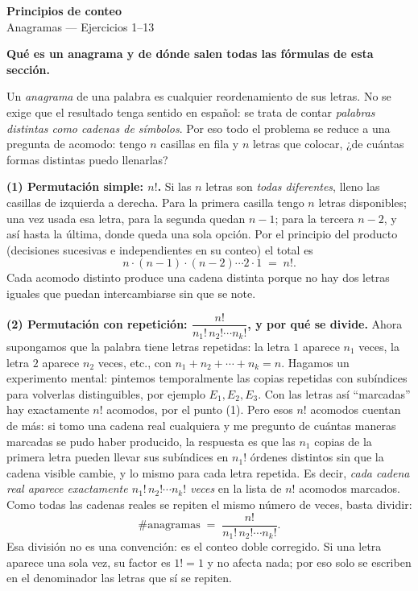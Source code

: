 \documentclass[11pt]{article}
\begin{document}
\begin{center}{\LARGE\bfseries Principios de conteo}\\[2pt]{\large Anagramas --- Ejercicios 1--13}\end{center}

\vspace{4pt}

\begin{teo}
\textbf{Qué es un anagrama y de dónde salen todas las fórmulas de esta sección.}

Un \emph{anagrama} de una palabra es cualquier reordenamiento de sus letras. No se exige que el resultado
tenga sentido en español: se trata de contar \emph{palabras distintas como cadenas de símbolos}. Por eso
todo el problema se reduce a una pregunta de acomodo: tengo $n$ casillas en fila y $n$ letras que colocar,
¿de cuántas formas distintas puedo llenarlas?

\medskip
\textbf{(1) Permutación simple: $n!$.} Si las $n$ letras son \emph{todas diferentes}, lleno las casillas de
izquierda a derecha. Para la primera casilla tengo $n$ letras disponibles; una vez usada esa letra, para la
segunda quedan $n-1$; para la tercera $n-2$, y así hasta la última, donde queda una sola opción. Por el
principio del producto (decisiones sucesivas e independientes en su conteo) el total es
\[
n\cdot(n-1)\cdot(n-2)\cdots 2\cdot 1 \;=\; n!.
\]
Cada acomodo distinto produce una cadena distinta porque no hay dos letras iguales que puedan intercambiarse
sin que se note.

\medskip
\textbf{(2) Permutación con repetición: $\dfrac{n!}{n_1!\,n_2!\cdots n_k!}$, y por qué se divide.} Ahora
supongamos que la palabra tiene letras repetidas: la letra $1$ aparece $n_1$ veces, la letra $2$ aparece
$n_2$ veces, etc., con $n_1+n_2+\cdots+n_k=n$. Hagamos un experimento mental: pintemos temporalmente las
copias repetidas con subíndices para volverlas distinguibles, por ejemplo $E_1,E_2,E_3$. Con las letras así
``marcadas'' hay exactamente $n!$ acomodos, por el punto (1). Pero esos $n!$ acomodos cuentan de más: si
tomo una cadena real cualquiera y me pregunto de cuántas maneras marcadas se pudo haber producido, la
respuesta es que las $n_1$ copias de la primera letra pueden llevar sus subíndices en $n_1!$ órdenes
distintos sin que la cadena visible cambie, y lo mismo para cada letra repetida. Es decir, \emph{cada cadena
real aparece exactamente $n_1!\,n_2!\cdots n_k!$ veces} en la lista de $n!$ acomodos marcados. Como todas las
cadenas reales se repiten el mismo número de veces, basta dividir:
\[
\#\text{anagramas} \;=\; \frac{n!}{n_1!\,n_2!\cdots n_k!}.
\]
Esa división no es una convención: es el conteo doble corregido. Si una letra aparece una sola vez, su factor
es $1!=1$ y no afecta nada; por eso solo se escriben en el denominador las letras que sí se repiten.


\end{teo}
\end{document}
